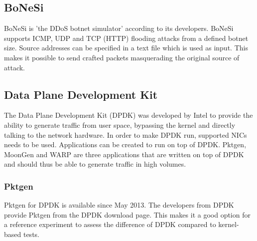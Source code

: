 \subsection{BoNeSi}\label{sub:bonesi}
BoNeSi is 'the DDoS botnet simulator' according to its developers. BoNeSi supports ICMP, UDP and TCP (HTTP) flooding attacks from a defined botnet size. Source addresses can be specified in a text file which is used as input. This makes it possible to send crafted packets masquerading the original source of attack.  


\subsection{Data Plane Development Kit}\label{sub:dpdk}
The Data Plane Development Kit\cite{dpdk} (DPDK) was developed by Intel to provide the ability to generate traffic from user space, bypassing the kernel and directly talking to the network hardware. In order to make DPDK run, supported NICs \cite{dpdknic} needs to be used. Applications can be created to run on top of DPDK. Pktgen, MoonGen and WARP are three applications that are written on top of DPDK and should thus be able to generate traffic in high volumes. 

\subsubsection{Pktgen}\label{subsub:dpdk-pktgen}
Pktgen for DPDK is available since May 2013. The developers from DPDK provide Pktgen from the DPDK download page. This makes it a good option for a reference experiment to assess the difference of DPDK compared to kernel-based tests. 

